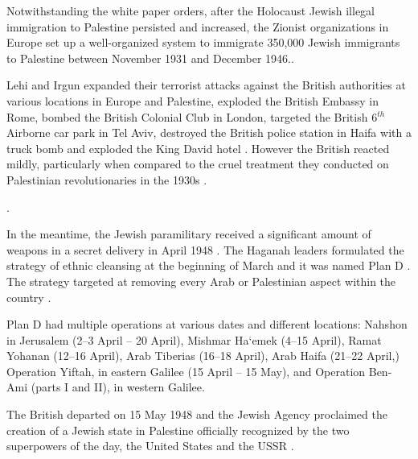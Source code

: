 Notwithstanding the white paper orders, after the Holocaust Jewish illegal immigration to Palestine persisted and increased, the Zionist organizations in Europe set up a well-organized system to immigrate 350,000 Jewish immigrants to Palestine between November 1931 and December 1946.\citep{Grob-Fitzgibbon2011, Heller1995}.   

Lehi and Irgun expanded their terrorist attacks against the British authorities at various locations in Europe and Palestine, exploded the British Embassy in Rome, bombed the British Colonial Club in London, targeted the British 6$^{th}$ Airborne car park in Tel Aviv, destroyed the British police station in Haifa with a truck bomb and exploded the King David hotel \citep{Bell1976}. However the British reacted mildly, particularly when compared to the cruel treatment they conducted on Palestinian revolutionaries in the 1930s \citep{Pappe2006}.
 
 
 
 
\cite[p.40]{Pappe2006}.
 
In the meantime, the Jewish paramilitary received a significant amount of weapons in a secret delivery in April 1948 \citep{Morris2008, Pappe2006}. 
The Haganah leaders formulated the strategy of ethnic cleansing at the beginning of March and it was named Plan D \citep{Shlaim2014}. The strategy targeted at removing every Arab or Palestinian aspect within the country \citep{Pappe2006, Shlaim2014}.
 
Plan D had multiple operations at various dates and different locations:
Nahshon in Jerusalem (2–3 April – 20 April),
Mishmar Ha‘emek (4–15 April),
Ramat Yohanan (12–16 April),
Arab Tiberias (16–18 April), 
Arab Haifa (21–22 April,)
Operation Yiftah, in eastern Galilee (15 April – 15 May), and
Operation Ben-Ami (parts I and II), in western Galilee\citep{Morris2004}.

The British departed on 15 May 1948 and the Jewish Agency proclaimed the creation of a Jewish state in Palestine officially recognized by the two superpowers of the day, the United States and the USSR \citep{Pappe2006}.
 
